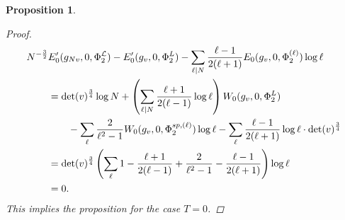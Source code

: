 \documentclass[reqno,oneside]{amsart}
\theoremstyle{plain}
\newtheorem{proposition}[theorem]{Proposition}
\theoremstyle{remark}
\numberwithin{theorem}{section}
\newcommand{\calL}{\mathcal L}
\begin{document}
\begin{proposition}
\begin{proof}
			\begin{align}
			N^{- \frac32} &	E'_0(g_{Nv}, 0, \Phi_2^{\calL} )  - E'_0(g_v, 0, \Phi_2^L) - \sum_{\ell|N} \frac{\ell-1}{2(\ell+1)} E_0(g_v,0,\Phi^{(\ell)}_2) \log \ell \\
			&= \det(v)^{\frac34} \log N+ \left( \sum_{\ell|N} \frac{\ell+1}{2(\ell-1)} \log \ell \right)W_0(g_v, 0 , \Phi_2^L)   \notag \\
			& \qquad - \sum_{\ell} \frac{2}{\ell^2-1} W_0(g_v, 0, \Phi_2^{sp,(\ell)}) \log \ell- \sum_{\ell} \frac{\ell-1}{2(\ell+1)} \log \ell \cdot \det(v)^{\frac34} \\
			&= \det(v)^{\frac34} \left( \sum_{\ell} 1 - \frac{\ell+1}{2(\ell-1)} + \frac{2}{\ell^2 -1} - \frac{\ell-1}{2(\ell+1)} \right) \log \ell \\
			&= 0 \notag.
			\end{align}
			This implies the proposition for the case $T=0$.
		\end{proof}
	\end{proposition}
	
\end{document}
